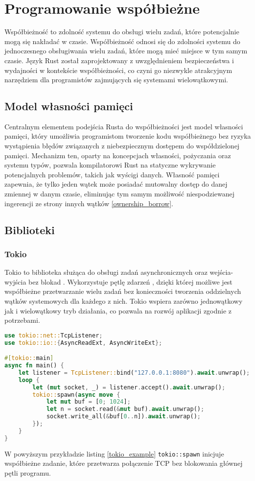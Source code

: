 \section{Programowanie współbieżne}
Współbieżność to zdolność systemu do obsługi wielu zadań, które potencjalnie mogą się nakładać w czasie. Współbieżność odnosi się do zdolności systemu do jednoczesnego obsługiwania wielu zadań, które mogą mieć miejsce w tym samym czasie. Język Rust został zaprojektowany z uwzględnieniem bezpieczeństwa i wydajności w kontekście współbieżności, co czyni go niezwykle atrakcyjnym narzędziem dla programistów zajmujących się systemami wielowątkowymi.

\subsection{Model własności pamięci}
Centralnym elementem podejścia Rusta do współbieżności jest model własności pamięci, który umożliwia programistom tworzenie kodu współbieżnego bez ryzyka wystąpienia błędów związanych z niebezpiecznym dostępem do współdzielonej pamięci. Mechanizm ten, oparty na koncepcjach własności, pożyczania oraz systemu typów, pozwala kompilatorowi Rust na statyczne wykrywanie potencjalnych problemów, takich jak wyścigi danych. Własność pamięci zapewnia, że tylko jeden wątek może posiadać mutowalny dostęp do danej zmiennej w danym czasie, eliminując tym samym możliwość niespodziewanej ingerencji ze strony innych wątków \ref{ownership_borrow}.

\subsection{Biblioteki}
\subsubsection{Tokio}
Tokio to biblioteka służąca do obsługi zadań asynchronicznych oraz wejścia-wyjścia bez blokad . Wykorzystuje pętlę zdarzeń , dzięki której możliwe jest współbieżne przetwarzanie wielu zadań bez konieczności tworzenia oddzielnych wątków systemowych dla każdego z nich. Tokio wspiera zarówno jednowątkowy jak i wielowątkowy tryb działania, co pozwala na rozwój aplikacji zgodnie z potrzebami.

\begin{lstlisting}[language=Rust, caption=Przykład użycia Tokio, label=tokio_example]
use tokio::net::TcpListener;
use tokio::io::{AsyncReadExt, AsyncWriteExt};

#[tokio::main]
async fn main() {
    let listener = TcpListener::bind("127.0.0.1:8080").await.unwrap();
    loop {
        let (mut socket, _) = listener.accept().await.unwrap();
        tokio::spawn(async move {
            let mut buf = [0; 1024];
            let n = socket.read(&mut buf).await.unwrap();
            socket.write_all(&buf[0..n]).await.unwrap();
        });
    }
}
\end{lstlisting}
W powyższym przykładzie listing \ref{tokio_example} \texttt{tokio::spawn} inicjuje współbieżne zadanie, które przetwarza połączenie TCP bez blokowania głównej pętli programu.

